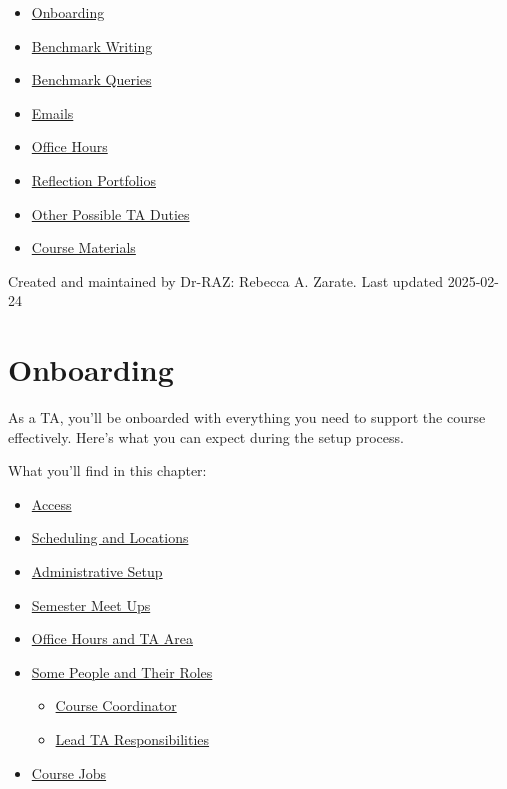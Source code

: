 \documentclass[
]{article}
\providecommand{\tightlist}{%
  \setlength{\itemsep}{0pt}\setlength{\parskip}{0pt}}
\begin{document}
\begin{itemize}
\tightlist
\item
  \protect\hyperlink{onboarding}{Onboarding}
\item
  \protect\hyperlink{benchmark-writing}{Benchmark Writing}
\item
  \protect\hyperlink{benchmark-queries}{Benchmark Queries}
\item
  \protect\hyperlink{emails}{Emails}
\item
  \protect\hyperlink{office-hours}{Office Hours}
\item
  \protect\hyperlink{reflection-portfolios}{Reflection Portfolios}
\item
  \protect\hyperlink{other-possible-ta-duties}{Other Possible TA Duties}
\item
  \protect\hyperlink{course-materials}{Course Materials}
\end{itemize}

Created and maintained by Dr-RAZ: Rebecca A. Zarate. Last updated 2025-02-24

\hypertarget{onboarding}{%
\section{Onboarding}\label{onboarding}}

As a TA, you'll be onboarded with everything you need to support the course effectively. Here's what you can expect during the setup process.

What you'll find in this chapter:

\begin{itemize}
\tightlist
\item
  \protect\hyperlink{access}{Access}
\item
  \protect\hyperlink{scheduling-and-locations}{Scheduling and Locations}
\item
  \protect\hyperlink{administrative-setup}{Administrative Setup}
\item
  \protect\hyperlink{semester-meet-ups}{Semester Meet Ups}
\item
  \protect\hyperlink{office-hours-and-ta-area}{Office Hours and TA Area}
\item
  \protect\hyperlink{some-people-and-their-roles}{Some People and Their Roles}

  \begin{itemize}
  \tightlist
  \item
    \protect\hyperlink{course-coordinator}{Course Coordinator}
  \item
    \protect\hyperlink{lead-ta-responsibilities}{Lead TA Responsibilities}
  \end{itemize}
\item
  \protect\hyperlink{course-jobs}{Course Jobs}
\end{itemize}
\end{document}
